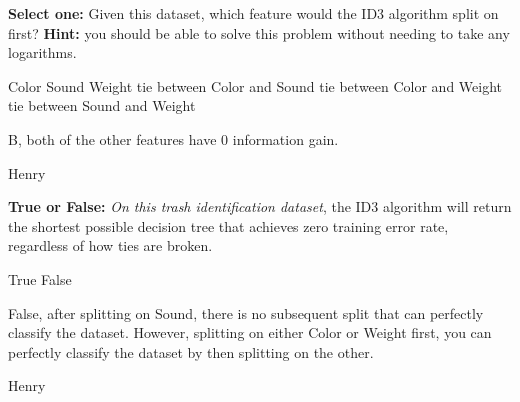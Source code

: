 \begin{parts}
\begin{subparts}
\subpart[2] \textbf{Select one:} Given this dataset, which feature would the ID3 algorithm split on first? \textbf{Hint:} you should be able to solve this problem without needing to take any logarithms. 
\begin{checkboxes}
    \choice Color 
    \choice Sound
    \choice Weight
    \choice tie between Color and Sound 
    \choice tie between Color and Weight
    \choice tie between Sound and Weight
\end{checkboxes}
\begin{soln}
    B, both of the other features have $0$ information gain. 
\end{soln}
\begin{qauthor}
    Henry
\end{qauthor}	

\subpart[1] \textbf{True or False:} \emph{On this trash identification dataset}, the ID3 algorithm will return the shortest possible decision tree that achieves zero training error rate, regardless of how ties are broken. %
\begin{checkboxes}
    \choice True 
    \choice False
\end{checkboxes}
\begin{soln}
    False, after splitting on Sound, there is no subsequent split that can perfectly classify the dataset. However, splitting on either Color or Weight first, you can perfectly classify the dataset by then splitting on the other. 
\end{soln}
\begin{qauthor}
    Henry 
\end{qauthor}		  
\end{subparts}

\end{parts}
